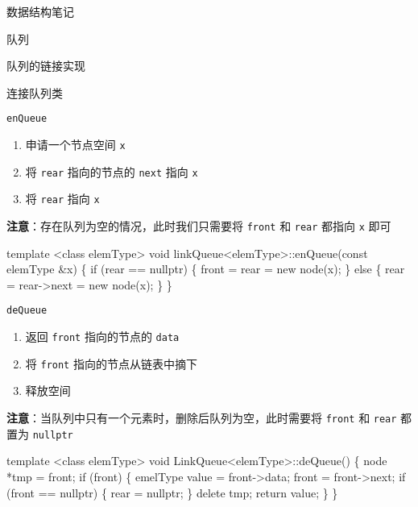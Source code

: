 \documentclass[
  ignorenonframetext,
]{beamer}
\newenvironment{Shaded}{}{}
\newcommand{\NormalTok}[1]{#1}
\providecommand{\tightlist}{%
  \setlength{\itemsep}{0pt}\setlength{\parskip}{0pt}}
\begin{document}
\begin{frame}[fragile]{数据结构笔记}
\begin{block}{队列}
\begin{block}{队列的链接实现}
\begin{block}{连接队列类}
\begin{block}{\texttt{enQueue}}
\protect{}\label{enqueue-1}
\begin{enumerate}
\tightlist
\item
  申请一个节点空间 \texttt{x}
\item
  将 \texttt{rear} 指向的节点的 \texttt{next} 指向 \texttt{x}
\item
  将 \texttt{rear} 指向 \texttt{x}
\end{enumerate}

\textbf{注意}：存在队列为空的情况，此时我们只需要将 \texttt{front} 和
\texttt{rear} 都指向 \texttt{x} 即可

\begin{Shaded}
\begin{Highlighting}[]
\NormalTok{template \textless{}class elemType\textgreater{}}
\NormalTok{void linkQueue\textless{}elemType\textgreater{}::enQueue(const elemType \&x)}
\NormalTok{\{}
\NormalTok{  if (rear == nullptr)}
\NormalTok{  \{}
\NormalTok{    front = rear = new node(x);}
\NormalTok{  \}}
\NormalTok{  else}
\NormalTok{  \{}
\NormalTok{    rear = rear{-}\textgreater{}next = new node(x);}
\NormalTok{  \}}
\NormalTok{\}}
\end{Highlighting}
\end{Shaded}
\end{block}

\begin{block}{\texttt{deQueue}}
\protect{}\label{dequeue-1}
\begin{enumerate}
\tightlist
\item
  返回 \texttt{front} 指向的节点的 \texttt{data}
\item
  将 \texttt{front} 指向的节点从链表中摘下
\item
  释放空间
\end{enumerate}

\textbf{注意}：当队列中只有一个元素时，删除后队列为空，此时需要将
\texttt{front} 和 \texttt{rear} 都置为 \texttt{nullptr}

\begin{Shaded}
\begin{Highlighting}[]
\NormalTok{template \textless{}class elemType\textgreater{}}
\NormalTok{void LinkQueue\textless{}elemType\textgreater{}::deQueue()}
\NormalTok{\{}
\NormalTok{  node *tmp = front;}
\NormalTok{  if (front)}
\NormalTok{  \{}
\NormalTok{    emelType value = front{-}\textgreater{}data;}
\NormalTok{    front = front{-}\textgreater{}next;}
\NormalTok{    if (front == nullptr)}
\NormalTok{    \{}
\NormalTok{      rear = nullptr;}
\NormalTok{    \}}
\NormalTok{    delete tmp;}
\NormalTok{    return value;}
\NormalTok{  \}}
\NormalTok{\}}
\end{Highlighting}
\end{Shaded}
\end{block}


\end{block}
\end{block}
\end{block}
\end{frame}
\end{document}
